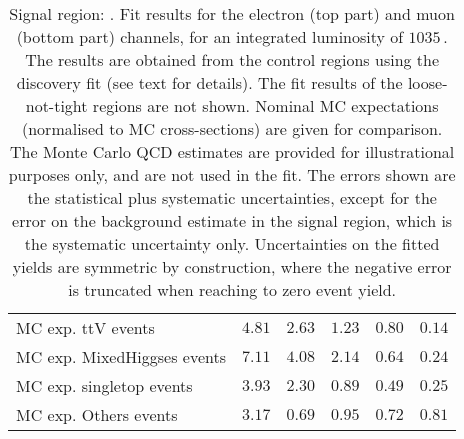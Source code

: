 \begin{table}
\begin{tabular*}{\textwidth}{@{\extracolsep{\fill}}lrrrrr}
        MC exp. ttV events         & $4.81$          & $2.63$          & $1.23$          & $0.80$          & $0.14$              \\
        MC exp. MixedHiggses events         & $7.11$          & $4.08$          & $2.14$          & $0.64$          & $0.24$              \\
        MC exp. singletop events         & $3.93$          & $2.30$          & $0.89$          & $0.49$          & $0.25$              \\
        MC exp. Others events         & $3.17$          & $0.69$          & $0.95$          & $0.72$          & $0.81$              \\
\bottomrule
\end{tabular*}
\caption{Signal region: . Fit results for the electron (top part) and muon (bottom part) channels, for an integrated luminosity of $1035$\,\ipb.
The results are obtained from the control regions using the discovery fit (see text for details). The fit results of the loose-not-tight regions are not shown.
Nominal MC expectations (normalised to MC cross-sections) are given for comparison. 
The Monte Carlo QCD estimates are provided for illustrational purposes only, and are not used in the fit.
The errors shown are the statistical plus systematic uncertainties, except for the error on the background estimate in the signal region, which is the systematic uncertainty only.
Uncertainties on the fitted yields are symmetric by construction, 
where the negative error is truncated when reaching to zero event yield.
}
\label{table.results.systematics.in.logL.fit.table.results.yields}
\end{table}
%